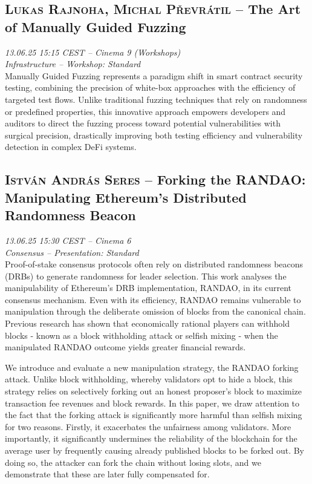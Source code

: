 \clearpage
\subsection {\textsc{Lukas Rajnoha, Michal Převrátil}  -- The Art of Manually Guided Fuzzing} \noindent \textit {13.06.25 15:15 CEST -- Cinema 9 (Workshops)\\ Infrastructure -- Workshop: Standard}\\[1em] Manually Guided Fuzzing represents a paradigm shift in smart contract security testing, combining the precision of white-box approaches with the efficiency of targeted test flows. Unlike traditional fuzzing techniques that rely on randomness or predefined properties, this innovative approach empowers developers and auditors to direct the fuzzing process toward potential vulnerabilities with surgical precision, drastically improving both testing efficiency and vulnerability detection in complex DeFi systems.

\clearpage
\subsection {\textsc{István András Seres}  -- Forking the RANDAO: Manipulating Ethereum’s Distributed Randomness Beacon} \noindent \textit {13.06.25 15:30 CEST -- Cinema 6\\ Consensus -- Presentation: Standard}\\[1em] Proof-of-stake consensus protocols often rely on distributed randomness beacons (DRBs) to generate randomness for leader selection. This work analyses the manipulability of Ethereum's DRB implementation, RANDAO, in its current consensus mechanism. Even with its efficiency, RANDAO remains vulnerable to manipulation through the deliberate omission of blocks from the canonical chain. Previous research has shown that economically rational players can withhold blocks - known as a block withholding attack or selfish mixing - when the manipulated RANDAO outcome yields greater financial rewards.

We introduce and evaluate a new manipulation strategy, the RANDAO forking attack. Unlike block withholding, whereby validators opt to hide a block, this strategy relies on selectively forking out an honest proposer's block to maximize transaction fee revenues and block rewards. 
In this paper, we draw attention to the fact that the forking attack is significantly more harmful than selfish mixing for two reasons. Firstly, it exacerbates the unfairness among validators. More importantly, it significantly undermines the reliability of the blockchain for the average user by frequently causing already published blocks to be forked out. By doing so, the attacker can fork the chain without losing slots, and we demonstrate that these are later fully compensated for.

